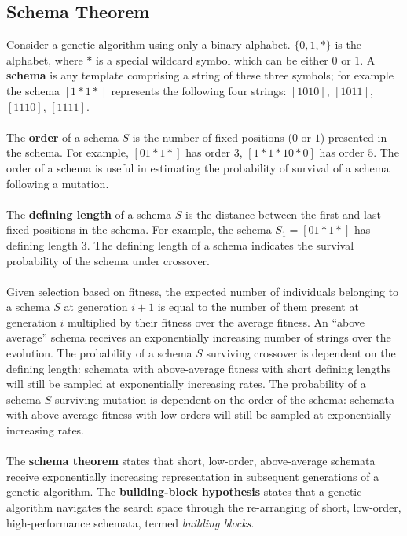 \documentclass[a4paper,11pt]{article}
\begin{document}
\subsection{Schema Theorem}
Consider a genetic algorithm using only a binary alphabet.
$\{0,1,*\}$ is the alphabet, where $*$ is a special wildcard symbol which can be either $0$ or $1$.
A \textbf{schema} is any template comprising a string of these three symbols;
for example the schema $[1*1*]$ represents the following four strings: $[1010]$, $[1011]$, $[1110]$, $[1111]$.
\\\\
The \textbf{order} of a schema $S$ is the number of fixed positions ($0$ or $1$) presented in the schema.
For example, $[01*1*]$ has order $3$, $[1*1*10*0]$ has order $5$.
The order of a schema is useful in estimating the probability of survival of a schema following a mutation.
\\\\
The \textbf{defining length} of a schema $S$ is the distance between the first and last fixed positions in the schema.
For example, the schema $S_1 = [01*1*]$ has defining length $3$.
The defining length of a schema indicates the survival probability of the schema under crossover.
\\\\
Given selection based on fitness, the expected number of individuals belonging to a schema $S$ at generation $i+1$ is equal to the number of them present at generation $i$ multiplied by their fitness over the average fitness.
An ``above average'' schema receives an exponentially increasing number of strings over the evolution.
The probability of a schema $S$ surviving crossover is dependent on the defining length: schemata with above-average fitness with short defining lengths will still be sampled at exponentially increasing rates.
The probability of a schema $S$ surviving mutation is dependent on the order of the schema: schemata with above-average fitness with low orders will still be sampled at exponentially increasing rates.
\\\\
The \textbf{schema theorem} states that short, low-order, above-average schemata receive exponentially increasing representation in subsequent generations of a genetic algorithm.
The \textbf{building-block hypothesis} states that a genetic algorithm navigates the search space through the re-arranging of short, low-order, high-performance schemata, termed \textit{building blocks}.
\end{document}
